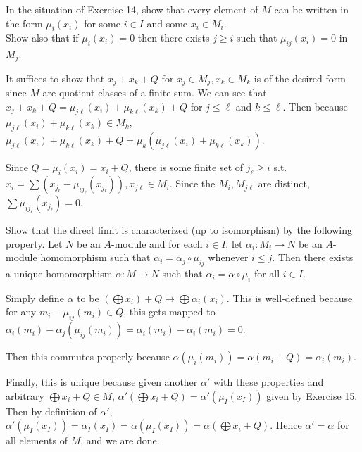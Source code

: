 \documentclass[a4paper]{exam}
\begin{document}
\begin{questions}
	\question In the situation of Exercise 14, show that every element of $M$ can be written in the form $\mu _i(x_i) $ for some $i\in I $ and some $x_i\in M_i $.\\
	Show also that if $\mu _i(x_i) = 0 $ then there exists $j \ge i $ such that $\mu _{ij}(x_i) = 0 $ in $M_j $.
	\begin{solution}
		It suffices to show that $x_j + x_k + Q$ for $x_j\in M_j, x_k\in M_k $ is of the desired form since $M $ are quotient classes of a finite sum.
		We can see that $x_j + x_k + Q = \mu_{j\ell}(x_i) + \mu_{k\ell}(x_k) + Q $ for $j \le \ell $ and $k\le \ell $.
		Then because $\mu_{j\ell}(x_i) + \mu_{k\ell}(x_k)\in M_k $, $\mu_{j\ell}(x_i) + \mu_{k\ell}(x_k) + Q = \mu_k(\mu_{j\ell}(x_i) + \mu_{k\ell}(x_k)) $.

		Since $Q = \mu_i(x_i) = x_i + Q$, there is some finite set of $j_\ell \ge i$ s.t. $x_i = \sum (x_{j_\ell} - \mu_{ij_\ell}(x_{j_\ell})), x_{j\ell} \in M_{i} $.
		Since the $M_i,M_{j\ell} $ are distinct, $\sum \mu _{ij_\ell}(x_{j_\ell}) = 0$.
	\end{solution}

	\question Show that the direct limit is characterized (up to isomorphism) by the following property. Let $N $ be an $A $-module and for each $i\in I $, let $\alpha _i: M_i \to N $ be an $A $-module homomorphism such that $\alpha _i = \alpha _j \circ \mu_{ij} $ whenever $i\le j $. Then there exists a unique homomorphism $\alpha :M\to N $ such that $\alpha _i = \alpha \circ \mu _i $ for all $i\in I $.
	\begin{solution}
		Simply define $\alpha  $ to be $\left(\bigoplus x_i\right) + Q \mapsto \bigoplus \alpha_i(x_i)$.
		This is well-defined because for any $m_i - \mu_{ij}(m_i) \in Q$, this gets mapped to $\alpha _i(m_i) - \alpha_j(\mu _{ij}(m_i)) = \alpha _i(m_i) - \alpha _i(m_i) = 0 $.

		Then this commutes properly because $\alpha (\mu _i(m_i)) = \alpha (m_i+Q) = \alpha _i(m_i)$.

		Finally, this is unique because given another $\alpha' $ with these properties and arbitrary $\bigoplus x_i +Q \in M $, $\alpha' (\bigoplus x_i+Q) = \alpha'(\mu _I(x_I))$ given by Exercise 15.
		Then by definition of $\alpha ' $, $\alpha '(\mu _I(x_I)) = \alpha_I(x_I) = \alpha(\mu _I(x_I)) = \alpha (\bigoplus x_i + Q)$.
		Hence $\alpha '= \alpha  $ for all elements of $M $, and we are done.


\end{solution}
\end{questions}
\end{document}
